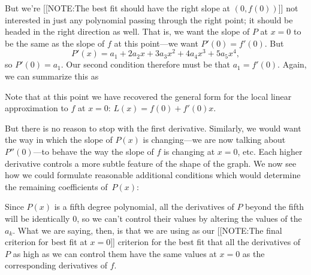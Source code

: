 \begin{center}
\end{center}

But we're 
[[NOTE:The best fit should have the right slope at $(0, f(0))$]]
not interested in just any polynomial passing through the right point;
it should be headed in the right direction as well.  That is, we want
the slope of $P$ at $x=0$ to be the same as the slope of $f$ at this
point---we want $P'(0)=f'(0).$ But
\[
P'(x) = a_1 + 2a_2x + 3a_3x^2 + 4a_4x^3 + 5a_5x^4,
\]
so $P'(0)=a_1$.  Our second condition therefore must be that
$a_1=f'(0)$.  Again, we can summarize this as


\begin{center}
\end{center}


Note that at this point we have recovered the general form for the
local linear approximation to $f$ at $x=0$: $L(x) = f(0) + f'(0)x$.

But there is no reason to stop with the first derivative.  Similarly,
we would want the way in which the slope of $P(x)$ is changing---we
are now talking about $P''(0)$---to behave the way the slope of $f$ is
changing at $x=0$, etc.  Each higher derivative controls a more subtle
feature of the shape of the graph.  We now see how we could formulate
reasonable additional conditions which would determine the remaining
coefficients of~$P(x)$:





\begin{center}
\end{center}




\enlargethispage*{20pt} Since $P(x)$ is a fifth degree polynomial, all
the derivatives of $P$ beyond the fifth will be identically 0, so we
can't control their values by altering the values of the $a_k$. What
we are saying, then, is that we are using as our
[[NOTE:The final criterion  for best fit at $x=0$]]
criterion for the best fit that all the derivatives of $P$ as high as
we can control them have the same values at $x=0$ as the corresponding
derivatives of $f$.

